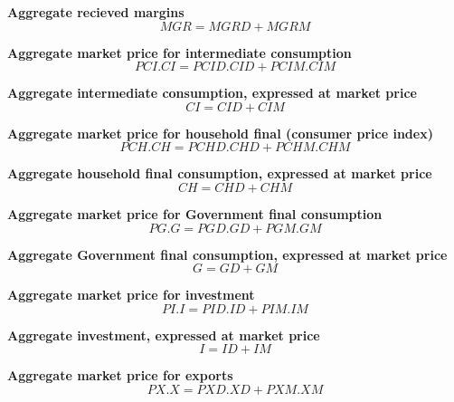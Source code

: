 \documentclass[12pt]{article}
\numberwithin{equation}{section}
\begin{document}
\noindent\textbf{Aggregate recieved margins} \\
\begin{dmath}
MGR = MGRD + MGRM
\end{dmath}

\noindent\textbf{Aggregate market price for intermediate consumption} \\
\begin{dmath}
PCI . CI = PCID . CID + PCIM . CIM
\end{dmath}

\noindent\textbf{Aggregate intermediate consumption, expressed at market price} \\
\begin{dmath}
CI = CID + CIM
\end{dmath}

\noindent\textbf{Aggregate market price for household final (consumer price index)} \\
\begin{dmath}
PCH . CH = PCHD . CHD + PCHM . CHM
\end{dmath}

\noindent\textbf{Aggregate household final consumption, expressed at market price} \\
\begin{dmath}
CH = CHD + CHM
\end{dmath}

\noindent\textbf{Aggregate market price for Government final consumption} \\
\begin{dmath}
PG . G = PGD . GD + PGM . GM
\end{dmath}

\noindent\textbf{Aggregate Government final consumption, expressed at market price} \\
\begin{dmath}
G = GD + GM
\end{dmath}

\noindent\textbf{Aggregate market price for investment} \\
\begin{dmath}
PI . I = PID . ID + PIM . IM
\end{dmath}

\noindent\textbf{Aggregate investment, expressed at market price} \\
\begin{dmath}
I = ID + IM
\end{dmath}

\noindent\textbf{Aggregate market price for exports} \\
\begin{dmath}
PX . X = PXD . XD + PXM . XM
\end{dmath}
\end{document}
